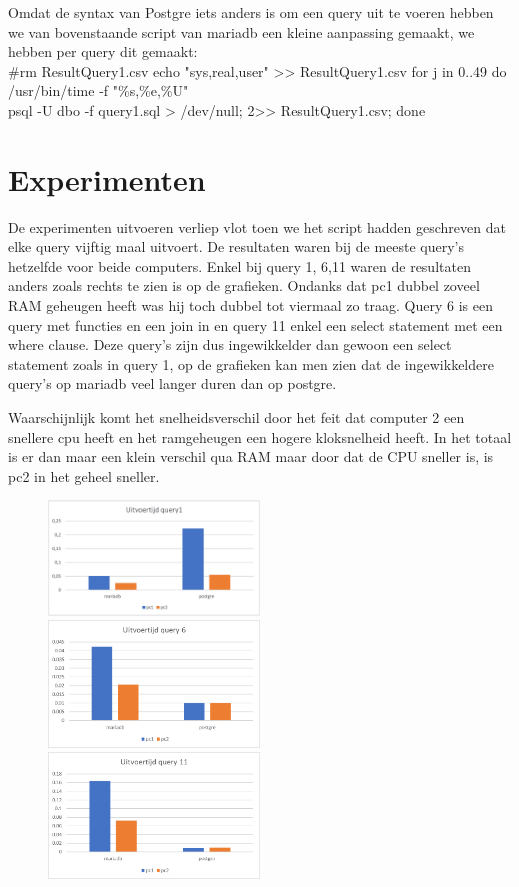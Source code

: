 \documentclass[fleqn,10pt]{artikeltin}
\begin{document}
Omdat de syntax van Postgre iets anders is om een query uit te voeren hebben we van bovenstaande script van mariadb een kleine aanpassing gemaakt, we hebben per query dit gemaakt: \\
 \#rm ResultQuery1.csv
echo "sys,real,user" >> ResultQuery1.csv
for j in {0..49}
do
{ /usr/bin/time -f "\%s,\%e,\%U" \\
 psql -U dbo -f query1.sql > /dev/null; } 2>> ResultQuery1.csv;
done 


\section{Experimenten}
\label{sec:experimenten}

De experimenten uitvoeren verliep vlot toen we het script hadden geschreven dat elke query vijftig maal uitvoert. De resultaten waren bij de meeste query's hetzelfde voor beide computers. Enkel bij query 1, 6,11 waren de resultaten anders zoals rechts te zien is op de grafieken. Ondanks dat pc1 dubbel zoveel RAM geheugen heeft was hij toch dubbel tot viermaal zo traag. Query 6 is een query met functies en een join in en query 11 enkel een select statement met een where clause. Deze query's zijn dus ingewikkelder dan gewoon een select statement zoals in query 1, op de grafieken kan men zien dat de ingewikkeldere query's op mariadb veel langer duren dan op postgre. 

Waarschijnlijk komt het snelheidsverschil door het feit dat computer 2 een snellere cpu heeft en het ramgeheugen een hogere kloksnelheid heeft. In het totaal is er dan maar een klein verschil qua RAM maar door dat de CPU sneller is, is pc2 in het geheel sneller. 

\begin{figure}
    \includegraphics[width=0.5\textwidth]{query1.png} \includegraphics[width=0.5\textwidth]{query6Graph.png} \includegraphics[width=0.5\textwidth]{query11Graph.png}
\end{figure}
\end{document}
